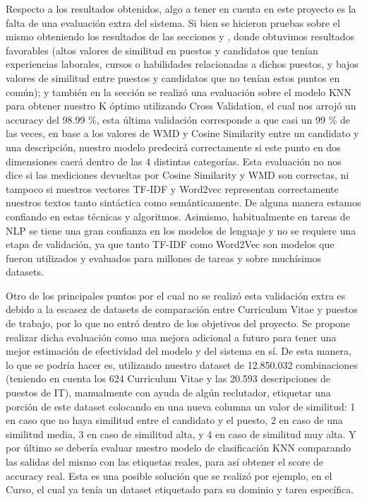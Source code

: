 \documentclass[12pt,a4paper]{article}
\begin{document}
\begin{sloppypar}
Respecto a los resultados obtenidos, algo a tener en cuenta en este proyecto es la falta de una evaluación extra del sistema. Si bien se hicieron pruebas sobre el mismo obteniendo los resultados de las secciones \textit{} y \textit{}, donde obtuvimos resultados favorables (altos valores de similitud en puestos y candidatos que tenían experiencias laborales, cursos o habilidades relacionadas a dichos puestos, y bajos valores de similitud entre puestos y candidatos que no tenían estos puntos en común); y también en la sección \textit{} se realizó una evaluación sobre el modelo KNN para obtener nuestro K óptimo utilizando Cross Validation, el cual nos arrojó un accuracy del 98.99 \%, esta última validación corresponde a que casi un 99 \% de las veces, en base a los valores de WMD y Cosine Similarity entre un candidato y una descripción, nuestro modelo predecirá correctamente si este punto en dos dimensiones caerá dentro de las 4 distintas categorías. Esta evaluación no nos dice si las mediciones devueltas por Cosine Similarity y WMD son correctas, ni tampoco si nuestros vectores TF-IDF y Word2vec representan correctamente nuestros textos tanto sintáctica como semánticamente. De alguna manera estamos confiando en estas técnicas y algoritmos. Asimismo, habitualmente en tareas de NLP se tiene una gran confianza en los modelos de lenguaje y no se requiere una etapa de validación, ya que tanto TF-IDF como Word2Vec son modelos que fueron utilizados y evaluados para millones de tareas y sobre muchísimos datasets\cite{similarity_2_survey}.

Otro de los principales puntos por el cual no se realizó esta validación extra es debido a la escasez de datasets de comparación entre Curriculum Vitae y puestos de trabajo, por lo que no entró dentro de los objetivos del proyecto. Se propone realizar dicha evaluación como una mejora adicional a futuro para tener una mejor estimación de efectividad del modelo y del sistema en sí. De esta manera, lo que se podría hacer es, utilizando nuestro dataset de 12.850.032 combinaciones (teniendo en cuenta los 624 Curriculum Vitae y las 20.593 descripciones de puestos de IT), manualmente con ayuda de algún reclutador, etiquetar una porción de este dataset colocando en una nueva columna un valor de similitud: 1 en caso que no haya similitud entre el candidato y el puesto, 2 en caso de una similitud media, 3 en caso de similitud alta, y 4 en caso de similitud muy alta. Y por último se debería evaluar nuestro modelo de clasificación KNN comparando las salidas del mismo con las etiquetas reales, para así obtener el score de accuracy real. Esta es una posible solución que se realizó por ejemplo, en el Curso\cite{NLP_28}, el cual ya tenía un dataset etiquetado para su dominio y tarea específica. 


\end{sloppypar}
\end{document}
